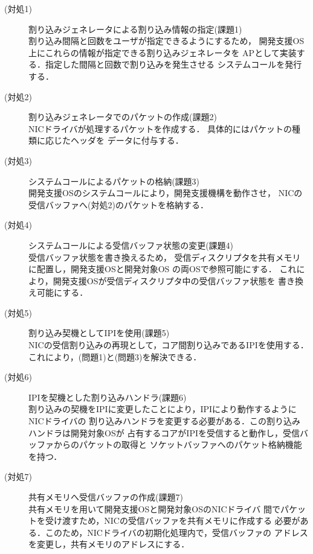 \documentclass[submit,techreq,noauthor,dvipdfmx]{ipsj}
\begin{document}
\begin{description}
    \item[(対処1)] 割り込みジェネレータによる割り込み情報の指定(課題1)\\
        割り込み間隔と回数をユーザが指定できるようにするため，
        開発支援OS上にこれらの情報が指定できる割り込みジェネレータを
        APとして実装する．指定した間隔と回数で割り込みを発生させる
        システムコールを発行する．
    \item[(対処2)] 割り込みジェネレータでのパケットの作成(課題2)\\
        NICドライバが処理するパケットを作成する．
        具体的にはパケットの種類に応じたヘッダを
        データに付与する．
    \item[(対処3)] システムコールによるパケットの格納(課題3)\\
        開発支援OSのシステムコールにより，開発支援機構を動作させ，
        NICの受信バッファへ(対処2)のパケットを格納する．
    \item[(対処4)] システムコールによる受信バッファ状態の変更(課題4)\\
        受信バッファ状態を書き換えるため，
        受信ディスクリプタを共有メモリに配置し，開発支援OSと開発対象OS
        の両OSで参照可能にする．
        これにより，開発支援OSが受信ディスクリプタ中の受信バッファ状態を
        書き換え可能にする．
    \item[(対処5)] 割り込み契機としてIPIを使用(課題5)\\
        NICの受信割り込みの再現として，コア間割り込みであるIPIを使用する．
        これにより，(問題1)と(問題3)を解決できる．
    \item[(対処6)] IPIを契機とした割り込みハンドラ(課題6)\\
        割り込みの契機をIPIに変更したことにより，IPIにより動作するようにNICドライバの
        割り込みハンドラを変更する必要がある．この割り込みハンドラは開発対象OSが
        占有するコアがIPIを受信すると動作し，受信バッファからのパケットの取得と
        ソケットバッファへのパケット格納機能を持つ．
    \item[(対処7)] 共有メモリへ受信バッファの作成(課題7)\\
        共有メモリを用いて開発支援OSと開発対象OSのNICドライバ
        間でパケットを受け渡すため，NICの受信バッファを共有メモリに作成する
        必要がある．このため，NICドライバの初期化処理内で，受信バッファの
        アドレスを変更し，共有メモリのアドレスにする．
\end{description}
\end{document}
